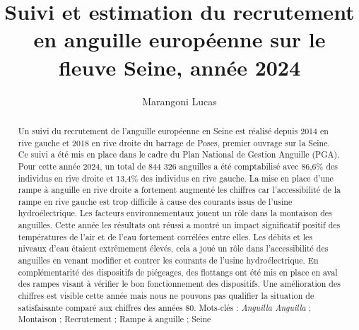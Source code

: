 \documentclass[11pt,titlepage,twoside]{article}\usepackage[]{graphicx}\usepackage[table]{xcolor}
\title{Suivi et estimation du recrutement en anguille européenne sur le fleuve Seine,
année 2024}
\author[1]{Marangoni Lucas}
\affil[1]{Seine-Normandie Migrateurs, 11 cours Clemenceau 76100 Rouen}
\begin{document}
\hypersetup{pageanchor=false}

\begin{titlepage}



\end{titlepage}



\newpage
\thispagestyle{empty}
\strut
\newpage

 \setcounter{page}{1}

\maketitle

\begin{abstract}


Un suivi du recrutement de l’anguille européenne en Seine est réalisé depuis 2014 en rive gauche et 2018 en rive droite du barrage de Poses, premier ouvrage sur la Seine. Ce suivi a été mis en place dans le cadre du Plan National de Gestion Anguille (PGA). Pour cette année 2024, un total de 844 326 anguilles a été comptabilisé avec 86,6\% des individus en rive droite et 13,4\% des individus en rive gauche. La mise en place d’une rampe à anguille en rive droite a fortement augmenté les chiffres car l’accessibilité de la rampe en rive gauche est trop difficile à cause des courants issus de l’usine hydroélectrique. Les facteurs environnementaux jouent un rôle dans la montaison des anguilles. Cette année les résultats ont réussi a montré un impact significatif positif des températures de l’air et de l’eau fortement corrélées entre elles. Les débits et les niveaux d’eau étaient extrêmement élevés, cela a joué un rôle dans l’accessibilité des anguilles en venant modifier et contrer les courants de l’usine hydroélectrique. En complémentarité des dispositifs de piégeages, des flottangs ont été mis en place en aval des rampes visant à vérifier le bon fonctionnement des dispositifs. Une amélioration des chiffres est visible cette année mais nous ne pouvons pas qualifier la situation de satisfaisante comparé aux chiffres des années 80.
Mots-clés :  \textit{Anguilla Anguilla} ; Montaison ; Recrutement ; Rampe à anguille ; Seine


\end{abstract}

\newpage

\tableofcontents

\clearpage
\end{document}
